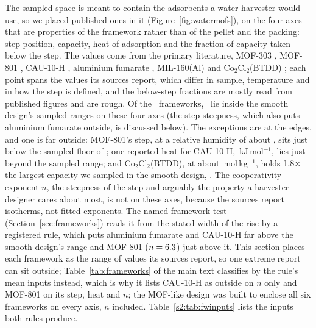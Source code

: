 The sampled space is meant to
contain the adsorbents a water harvester would use, so we placed published ones in it
(Figure~\ref{fig:watermofs}), on the four axes that are properties of the framework
rather than of the pellet and the packing: step position, capacity, heat of
adsorption and the fraction of capacity taken below the step. The values come from
the primary literature, MOF-303 \cite{hanikel2019rapid,fathieh2018practical},
MOF-801 \cite{furukawa2014water}, CAU-10-H \cite{solovyeva2021cau,frohlich2016water},
aluminium fumarate \cite{hanikel2019rapid,laurenz2020novel}, MIL-160(Al)
\cite{solovyeva2021mil,aumond2026adsorption,lenzen2019metal} and
Co\(_2\)Cl\(_2\)(BTDD) \cite{rieth2017record}; each point spans the values its
sources report, which differ in sample, temperature and in how the step is defined,
and the below-step fractions are mostly read from published figures and are rough.
Of the \nWmofN\ frameworks, \nWmofInside\ lie inside the smooth design's sampled ranges on
these four axes (the step steepness, which also puts aluminium fumarate outside, is
discussed below). The
exceptions are at the edges, and one is far outside: MOF-801's step, at a relative humidity of about
\nWmofEightStep, sits just below the sampled floor of \nWmofStepLo; one reported heat
for CAU-10-H, \nWmofCauHeat\,kJ\,mol\(^{-1}\), lies just beyond the sampled range; and
Co\(_2\)Cl\(_2\)(BTDD), at about \nWmofBtddQ\,mol\,kg\(^{-1}\), holds
\(1.8\times\) the largest capacity we sampled in the smooth design,
\nWmofQmaxHi. The cooperativity exponent \(n\), the steepness of the step and arguably the
property a harvester designer cares about most, is not on these axes, because the sources
report isotherms, not fitted exponents. The named-framework test (Section~\ref{sec:frameworks})
reads it from the stated width of the rise by a registered rule, which puts aluminium
fumarate and CAU-10-H far above the smooth design's range and MOF-801 (\(n =
6.3\)) just above it. This section places each framework as the range of values
its sources report, so one extreme report can sit outside; Table~\ref{tab:frameworks} of
the main text classifies by the rule's mean inputs instead, which is why it lists CAU-10-H
as outside on \(n\) only and MOF-801 on its step, heat and \(n\); the MOF-like design was built to
enclose all six frameworks on every axis, \(n\) included. Table~\ref{s2:tab:fwinputs} lists
the inputs both rules produce.

